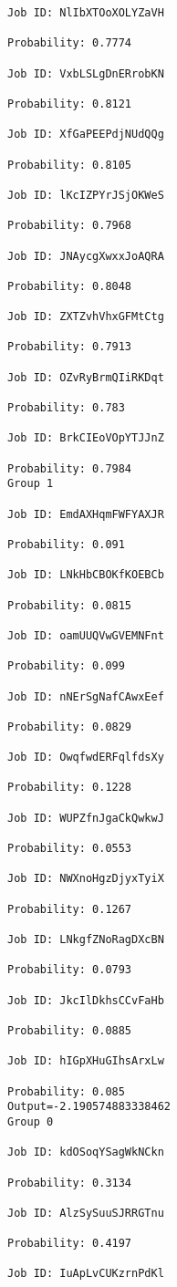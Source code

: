 \documentclass[11pt]{article}
\begin{document}
\begin{Verbatim}[commandchars=\\\{\}]
Job ID: NlIbXTOoXOLYZaVH

Probability: 0.7774

Job ID: VxbLSLgDnERrobKN

Probability: 0.8121

Job ID: XfGaPEEPdjNUdQQg

Probability: 0.8105

Job ID: lKcIZPYrJSjOKWeS

Probability: 0.7968

Job ID: JNAycgXwxxJoAQRA

Probability: 0.8048

Job ID: ZXTZvhVhxGFMtCtg

Probability: 0.7913

Job ID: OZvRyBrmQIiRKDqt

Probability: 0.783

Job ID: BrkCIEoVOpYTJJnZ

Probability: 0.7984
Group 1

Job ID: EmdAXHqmFWFYAXJR

Probability: 0.091

Job ID: LNkHbCBOKfKOEBCb

Probability: 0.0815

Job ID: oamUUQVwGVEMNFnt

Probability: 0.099

Job ID: nNErSgNafCAwxEef

Probability: 0.0829

Job ID: OwqfwdERFqlfdsXy

Probability: 0.1228

Job ID: WUPZfnJgaCkQwkwJ

Probability: 0.0553

Job ID: NWXnoHgzDjyxTyiX

Probability: 0.1267

Job ID: LNkgfZNoRagDXcBN

Probability: 0.0793

Job ID: JkcIlDkhsCCvFaHb

Probability: 0.0885

Job ID: hIGpXHuGIhsArxLw

Probability: 0.085
Output=-2.190574883338462
Group 0

Job ID: kdOSoqYSagWkNCkn

Probability: 0.3134

Job ID: AlzSySuuSJRRGTnu

Probability: 0.4197

Job ID: IuApLvCUKzrnPdKl


\end{Verbatim}
\end{document}
